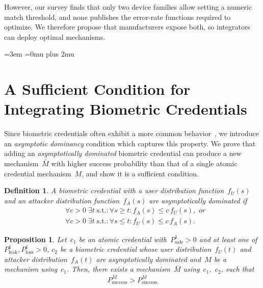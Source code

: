 \documentclass[conference,compsoc]{IEEEtran}
\newtheorem{proposition}{Proposition}
\newtheorem{definition}{Definition}
\begin{document}
However, our survey finds that only two device families allow setting a numeric match threshold, and none publishes the error-rate functions required to optimize. We therefore propose that manufacturers expose both, so integrators can deploy optimal mechanisms.

{
\raggedright
\emergencystretch=3em
\Urlmuskip=0mu plus 2mu\relax
\def\UrlBreaks{%
  \do\a\do\b\do\c\do\d\do\e\do\f\do\g\do\h\do\i\do\j\do\k\do\l\do\m
  \do\n\do\o\do\p\do\q\do\r\do\s\do\t\do\u\do\v\do\w\do\x\do\y\do\z
  \do\A\do\B\do\C\do\D\do\E\do\F\do\G\do\H\do\I\do\J\do\K\do\L\do\M
  \do\N\do\O\do\P\do\Q\do\R\do\S\do\T\do\U\do\V\do\W\do\X\do\Y\do\Z
  \do\0\do\1\do\2\do\3\do\4\do\5\do\6\do\7\do\8\do\9
  \do\/\do\-\do\.\do\_\do\?\do\&\do\=\do\#}


}

\appendices

\section{A Sufficient Condition for Integrating Biometric Credentials}
\label{app:sufficient-condition}
\noindent
Since biometric credentials often exhibit a more common behavior~\cite{Slob2005,anil2004}, we introduce an \emph{asymptotic dominancy} condition which captures this property. We prove that adding an \emph{asymptotically dominated} biometric credential can produce a new mechanism~$\bar{M}$ with higher success probability than that of a single atomic credential mechanism~$M$, and show it is a sufficient condition.
\begin{definition}
\label{def:asym_dominance}
A biometric credential with a user distribution function~$f_U(s)$ and an attacker distribution function~$f_A(s)$ are \emph{asymptotically dominated} if
\begin{equation*}
\begin{aligned}
&\forall c>0\;\exists t\; \text{s.t.}:\forall s \ge t: f_A(s)\le c\,f_U(s),\textit{ or} \\
&\forall c>0\;\exists t\; \text{s.t.}:\forall s \le t: f_U(s)\le c\,f_A(s).
\end{aligned}
\end{equation*}
\end{definition}

\begin{proposition}\label{thm:biometric-improves-security}
Let~$c_1$ be an atomic credential with~$P^1_\text{safe} > 0$ and at least one of~$P^1_\text{leak},P^1_\text{loss} > 0$, $c_2$ be a biometric credential whose user distribution~$f_U(t)$ and attacker distribution~$f_A(t)$ are asymptotically dominated and~$M$ be a mechanism using~$c_1$. Then, there exists a mechanism~$\bar{M}$ using~$c_1$,~$c_2$, such that
    \begin{equation*}
        P_{\mathrm{success}}^{\bar{M}} > P_{\mathrm{success}}^{M}
    \end{equation*}
\end{proposition}
\end{document}
